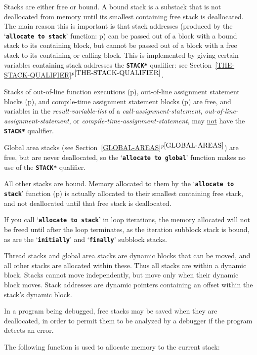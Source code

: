 \documentclass[12pt]{article}
\newcommand{\TT}[1]{{\tt \bfseries #1}}
\newcommand{\itemref}[1]{\ref{#1}$^{p\pageref{#1}}$}
\newcommand{\pagref}[1]{p\pageref{#1}}
\begin{document}
Stacks are either free or bound.\label{FREE-STACK}
A bound stack is a substack that is
not deallocated from memory until its smallest containing free stack is
deallocated.  The main reason this is important is that stack addresses
(produced by the `\TT{allocate to stack}' function:
\pagref{ALLOCATE-TO-STACK})
can be passed out of a block with a bound stack to its containing block,
but cannot be passed out of a block with a free stack to its containing
or calling block.  This is implemented by giving certain
variables containing stack addresses the \TT{*STACK*} qualifier: see
Section~\itemref{THE-STACK-QUALIFIER}.

Stacks of out-of-line function executions
(\pagref{OUT-OF-LINE-FUNCTIONS}),
out-of-line assignment statement blocks
(\pagref{OUT-OF-LINE-ASSIGNMENT-STATEMENTS}),
and
compile-time assignment statement blocks
(\pagref{COMPILE-TIME-ASSIGNMENT-STATEMENTS})
are free, and variables in the {\em result-variable-list}
of a {\em call-assignment-statement},
{\em out-of-line-assignment-statement}, or
{\em compile-time-assignment-statement},
may \underline{not} have the \TT{*STACK*} qualifier.

Global area stacks (see Section~\itemref{GLOBAL-AREAS}) are free,
but are never deallocated, so the
`\TT{allocate to global}' function makes no use of the \TT{*STACK*}
qualifier.

All other stacks are bound.  Memory allocated to them
by the `\TT{allocate to stack}' function (\pagref{ALLOCATE-TO-STACK})
is actually
allocated to their smallest containing free stack, and not deallocated
until that free stack is deallocated.

If you call `\TT{allocate to stack}' in loop iterations, the memory
allocated will not be freed until after the loop terminates, as the
iteration subblock stack is bound, as are the
`\TT{initially}' and `\TT{finally}' subblock stacks.

Thread stacks and global area stacks are dynamic blocks that can be moved,
and all other stacks are allocated within these.  Thus all stacks are
within a dynamic block.  Stacks cannot move independently, but move
only when their dynamic block moves.  Stack addresses are dynamic
pointers containing an offset within the stack's dynamic block.

In a program being debugged, free stacks may be saved when they are
deallocated, in order to permit them to be analyzed
by a debugger if the program detects an error.

The following function is used to allocate memory to the
current stack:
\end{document}
